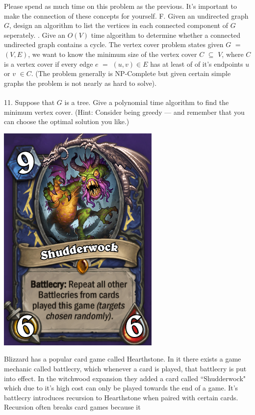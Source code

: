 \documentclass[12pt]{article}
\begin{document}
Please spend as much time on this problem as the previous. It's important to make the connection 
of these concepts for yourself.
\newpage
\noindent F. Given an undirected graph $G$, design an algorithm to list the vertices in each connected component of $G$ seperately.
\newpage
{}. Give an $O(V)$ time algorithm to determine whether a connected undirected graph contains a cycle.
\newpage 
\noindent The vertex cover problem states given $G$ $=$ $(V,E)$, we 
want to know the minimum size of the vertex cover $C$ $\subseteq$ $V$, where $C$ is a vertex cover if every 
edge $e$ $=$ $(u,v)\in E$ has at least of of it's endpoints $u$ or $v$ $\in C$.
(The problem generally is NP-Complete but given certain simple graphs the problem is not nearly as hard to solve).\\\\
11. Suppose that $G$ is a tree. Give a polynomial time algorithm to find the
minimum vertex cover. (Hint: Consider being greedy — and remember that you
can choose the optimal solution you like.)
\newpage
\noindent \centerline{\includegraphics[scale = 2]{shudderwock.jpg}}
Blizzard has a popular card game called Hearthstone. In it 
there exists a game mechanic called battlecry, which whenever a card is played,
 that battlecry is put into effect. In the witchwood expansion they added a card called
 ``Shudderwock" which due to it's high cost can only be played towards the end of a game. It's battlecry 
 introduces recursion to Hearthstone when paired with certain cards. Recursion often breaks card games because it 
\end{document}
